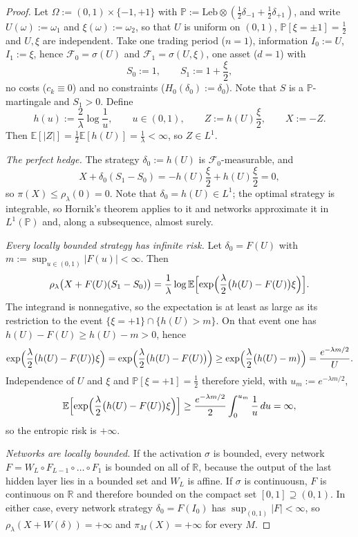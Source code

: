 \documentclass[11pt,a4paper]{report}
\numberwithin{equation}{chapter}
\theoremstyle{plain}
\theoremstyle{definition}
\newcommand{\E}{\mathbb{E}}
\newcommand{\PP}{\mathbb{P}}
\newcommand{\R}{\mathbb{R}}
\newcommand{\F}{\mathcal{F}}
\begin{document}
\begin{proof}
  Let $\Omega:=(0,1)\times\{-1,+1\}$ with
  $\PP:=\mathrm{Leb}\otimes(\frac{1}{2}\delta_{-1}+\frac{1}{2}\delta_{+1})$,
  and write $U(\omega):=\omega_1$ and $\xi(\omega):=\omega_2$, so that
  $U$ is uniform on $(0,1)$, $\PP[\xi=\pm1]=\frac{1}{2}$ and $U,\xi$ are
  independent. Take one trading period ($n=1$), information $I_0:=U$,
  $I_1:=\xi$, hence $\F_0=\sigma(U)$ and $\F_1=\sigma(U,\xi)$, one asset
  ($d=1$) with
  \[
    S_0:=1,\qquad S_1:=1+\frac{\xi}{2},
  \]
  no costs ($c_k\equiv0$) and no constraints ($H_0(\delta_0):=\delta_0$).
  Note that $S$ is a $\PP$-martingale and
  $S_1>0$. Define
  \[
    h(u):=\frac{2}{\lambda}\log\frac{1}{u},\qquad u\in(0,1),\qquad
    Z:=h(U)\frac{\xi}{2},\qquad X:=-Z.
  \]
  Then $\E[|Z|]=\frac{1}{2}\E[h(U)]=\frac{1}{\lambda}<\infty$, so
  $Z\in L^1$.

  \textit{The perfect hedge.}
  The strategy $\delta_0:=h(U)$ is $\F_0$-measurable, and
  \[
    X+\delta_0(S_1-S_0)=-h(U)\frac{\xi}{2}+h(U)\frac{\xi}{2}=0,
  \]
  so $\pi(X)\le\rho_\lambda(0)=0$. Note that $\delta_0=h(U)\in L^1$; the
  optimal strategy is integrable, so Hornik's theorem applies to it and
  networks approximate it in $L^1(\PP)$ and, along a subsequence, almost
  surely.

  \textit{Every locally bounded strategy has infinite risk.}
  Let $\delta_0=F(U)$ with $m:=\sup_{u\in(0,1)}|F(u)|<\infty$. Then
  \[
    \rho_\lambda\bigl(X+F(U)(S_1-S_0)\bigr)
    =\frac{1}{\lambda}\log\E\Bigl[\exp\Bigl(\frac{\lambda}{2}\bigl(h(U)-F(U)\bigr)\xi\Bigr)\Bigr].
  \]
  The integrand is nonnegative, so the expectation is at least as large as
  its restriction to the event $\{\xi=+1\}\cap\{h(U)>m\}$. On that event one
  has $h(U)-F(U)\ge h(U)-m>0$, hence
  \[
    \exp\Bigl(\frac{\lambda}{2}\bigl(h(U)-F(U)\bigr)\xi\Bigr)
    =\exp\Bigl(\frac{\lambda}{2}\bigl(h(U)-F(U)\bigr)\Bigr)
    \ge\exp\Bigl(\frac{\lambda}{2}\bigl(h(U)-m\bigr)\Bigr)
    =\frac{e^{-\lambda m/2}}{U}.
  \]
  Independence of $U$ and $\xi$ and $\PP[\xi=+1]=\frac{1}{2}$ therefore yield,
  with $u_m:=e^{-\lambda m/2}$,
  \[
    \E\Bigl[\exp\Bigl(\frac{\lambda}{2}\bigl(h(U)-F(U)\bigr)\xi\Bigr)\Bigr]
    \ge\frac{e^{-\lambda m/2}}{2}\int_0^{u_m}\frac{1}{u}\,du=\infty,
  \]
  so the entropic risk is $+\infty$.

  \textit{Networks are locally bounded.}
  If the activation $\sigma$ is bounded, every network
  $F=W_L\circ F_{L-1}\circ\dots\circ F_1$ is bounded on all of $\R$,
  because the output of the last hidden layer lies in a bounded set and
  $W_L$ is affine. If $\sigma$ is continuousn, $F$ is continuous on $\R$ and therefore bounded on the
  compact set $[0,1]\supseteq(0,1)$. In either case, every network
  strategy $\delta_0=F(I_0)$ has $\sup_{(0,1)}|F|<\infty$, so
  $\rho_\lambda(X+W(\delta))=+\infty$ and $\pi_M(X)=+\infty$ for every
  $M$.
\end{proof}
\end{document}
